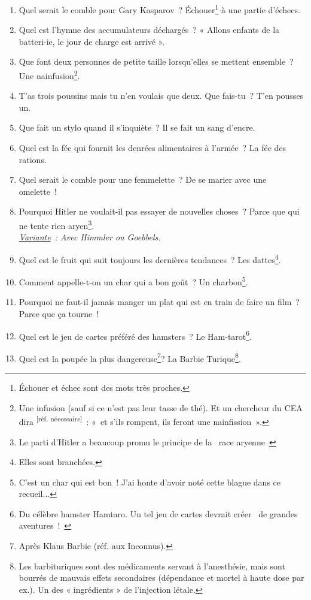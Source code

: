 \documentclass[10pt,a5paper,fullpage]{book}
\begin{document}
\begin{enumerate}
		\item Quel serait le comble pour Gary Kasparov~? Échouer\footnote{Échouer et échec sont des mots très proches.} à une partie d'échecs. 
		\item Quel est l’hymne des accumulateurs déchargés~? « Allons enfants de la batteri-ie, le jour de charge est arrivé \textmusicalnote ».
		\item Que font deux personnes de petite taille lorsqu'elles se mettent ensemble~? Une nainfusion\footnote{Une infusion (sauf si ce n'est pas leur tasse de thé). Et un chercheur du CEA dira \textsuperscript{[réf. nécessaire]}~: «~et s’ils rompent, ils feront une nainfission~».}.
		\item T’as trois poussins mais tu n'en voulais que deux. Que fais-tu~? T’en pousses un.
		\item Que fait un stylo quand il s’inquiète~? Il se fait un sang d’encre.
		\item Quel est la fée qui fournit les denrées alimentaires à l’armée~? La fée des rations.
		\item Quel serait le comble pour une femmelette~? De se marier avec une omelette~!
		\item Pourquoi Hitler ne voulait-il pas essayer de nouvelles choses~? Parce que qui ne tente rien aryen\footnote{Le parti d'Hitler a beaucoup promu le principe de la \guillemotleft~race aryenne~\guillemotright}. \\\textit{\underline{Variante}~: Avec Himmler ou Goebbels.}
		\item Quel est le fruit qui suit toujours les dernières tendances~? Les dattes\footnote{Elles sont branchées.}.
		\item Comment appelle-t-on un char qui a bon goût~? Un charbon\footnote{C'est un char qui est bon~! J'ai honte d'avoir noté cette blague dans ce recueil...}.
		\item Pourquoi ne faut-il jamais manger un plat qui est en train de faire un film~? Parce que ça tourne~!
		\item Quel est le jeu de cartes préféré des hamsters~? Le Ham-tarot\footnote{Du célèbre hamster Hamtaro. Un tel jeu de cartes devrait créer \guillemotleft~de grandes aventures~!~\guillemotright}.
		\item Quel est la poupée la plus dangereuse\footnote{Après Klaus Barbie (réf. aux Inconnus).}? La Barbie Turique\footnote{Les barbituriques sont des médicaments servant à l’anesthésie, mais sont bourrés de mauvais effets secondaires (dépendance et mortel à haute dose par ex.). Un des « ingrédients » de l’injection létale.}. 

\end{enumerate}
\end{document}
